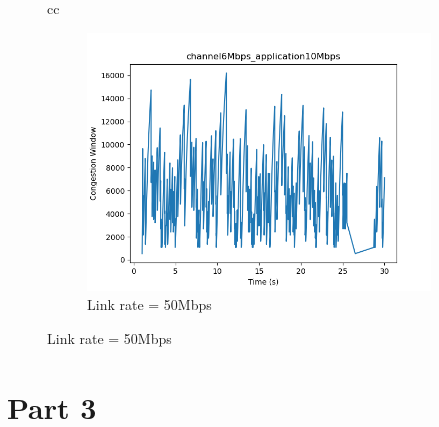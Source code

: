 \documentclass[11pt]{article}
\begin{document}
\begin{figure}[H]
\begin{tabular}[c]{cc}
      {\begin{subfigure}[c]{0.5\textwidth}
        \centering
        \includegraphics[width=\textwidth]{Q2/outputs/channel6Mbps_application10Mbps.png}
        \caption{Link rate = 50Mbps}
      \end{subfigure}}
    
  \end{tabular}
\end{figure}

\section{Part 3}
\end{document}
